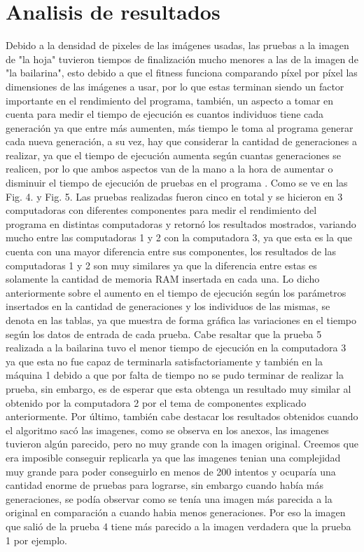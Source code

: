 \documentclass[conference]{IEEEtran}
\begin{document}
\section{Analisis de resultados}\label{SCM}
Debido a la densidad de pixeles de las imágenes usadas, las pruebas a la imagen de "la hoja" tuvieron tiempos de finalización mucho menores a las de la imagen de "la bailarina", esto debido a que el fitness funciona comparando píxel por píxel las dimensiones de las imágenes a usar, por lo que estas terminan siendo un factor importante en el rendimiento del programa, también, un aspecto a tomar en cuenta para medir el tiempo de ejecución es cuantos individuos tiene cada generación ya que entre más aumenten, más tiempo le toma al programa generar cada nueva generación, a su vez, hay que considerar la cantidad de generaciones a realizar, ya que el tiempo de ejecución aumenta según cuantas generaciones se realicen, por lo que ambos aspectos van de la mano a la hora de aumentar o disminuir el tiempo de ejecución de pruebas en el programa .
Como se ve en las Fig. 4. y Fig. 5. Las pruebas realizadas fueron cinco en total y se hicieron en 3 computadoras con diferentes componentes para medir el rendimiento del programa en distintas computadoras y retornó los resultados mostrados, variando mucho entre las computadoras 1 y 2 con la computadora 3, ya que esta es la que cuenta con una mayor diferencia entre sus componentes, los resultados de las computadoras 1 y 2 son muy similares ya que la diferencia entre estas es solamente la cantidad de memoria RAM insertada en cada una.
Lo dicho anteriormente sobre el aumento en el tiempo de ejecución según los parámetros insertados en la cantidad de generaciones y los individuos de las mismas, se denota en las tablas, ya que muestra de forma gráfica las variaciones en el tiempo según los datos de entrada de cada prueba.
Cabe resaltar que la prueba 5 realizada a la bailarina tuvo el menor tiempo de ejecución en la computadora 3 ya que esta no fue capaz de terminarla satisfactoriamente y también en la máquina 1 debido a que por falta de tiempo no se pudo terminar de realizar la prueba, sin embargo, es de esperar que esta obtenga un resultado muy similar al obtenido por la computadora 2 por el tema de componentes explicado anteriormente.
Por último, también cabe destacar los resultados obtenidos cuando el algoritmo sacó las imagenes, como se observa en los anexos, las imagenes tuvieron algún parecido, pero no muy grande con la imagen original. Creemos que era imposible conseguir replicarla ya que las imagenes tenian una complejidad muy grande para poder conseguirlo en menos de 200 intentos y ocuparía una cantidad enorme de pruebas para lograrse, sin embargo cuando había más generaciones, se podía observar como se tenía una imagen más parecida a la original en comparación a cuando habia menos generaciones. Por eso la imagen que salió de la prueba 4 tiene más parecido a la imagen verdadera que la prueba 1 por ejemplo. 
\end{document}
